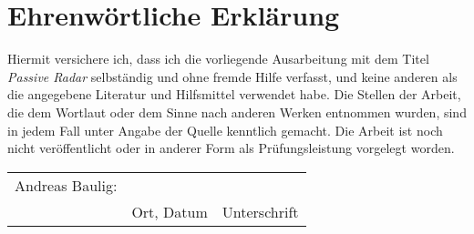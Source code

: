 \chapter*{Ehrenwörtliche Erklärung}

Hiermit versichere ich, dass ich die vorliegende Ausarbeitung mit dem Titel \emph{Passive Radar} selbständig und ohne fremde Hilfe verfasst, und keine anderen als die angegebene Literatur und Hilfsmittel verwendet habe. Die Stellen der Arbeit, die dem Wortlaut oder dem Sinne nach anderen Werken entnommen wurden, sind in jedem Fall unter Angabe der Quelle kenntlich gemacht. Die Arbeit ist noch nicht veröffentlicht oder in anderer Form als Prüfungsleistung vorgelegt worden.

\vspace{4cm}

\begin{tabularx}{\textwidth}{ l X X}
    Andreas Baulig: & \hrulefill & \hrulefill   \\
    \vspace{1.5cm}  & Ort, Datum & Unterschrift \\
\end{tabularx}
